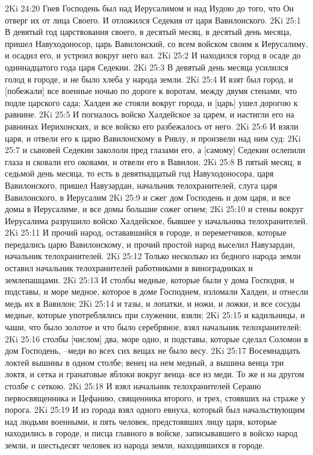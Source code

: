 2Ki 24:20  Гнев Господень был над Иерусалимом и над Иудою до того, что Он отверг их от лица Своего. И отложился Седекия от царя Вавилонского.
2Ki 25:1  В девятый год царствования своего, в десятый месяц, в десятый день месяца, пришел Навуходоносор, царь Вавилонский, со всем войском своим к Иерусалиму, и осадил его, и устроил вокруг него вал.
2Ki 25:2  И находился город в осаде до одиннадцатого года царя Седекии.
2Ki 25:3  В девятый день месяца усилился голод в городе, и не было хлеба у народа земли.
2Ki 25:4  И взят был город, и [побежали] все военные ночью по дороге к воротам, между двумя стенами, что подле царского сада; Халдеи же стояли вокруг города, и [царь] ушел дорогою к равнине.
2Ki 25:5  И погналось войско Халдейское за царем, и настигли его на равнинах Иерихонских, и все войско его разбежалось от него.
2Ki 25:6  И взяли царя, и отвели его к царю Вавилонскому в Ривлу, и произвели над ним суд:
2Ki 25:7  и сыновей Седекии закололи пред глазами его, а [самому] Седекии ослепили глаза и сковали его оковами, и отвели его в Вавилон.
2Ki 25:8  В пятый месяц, в седьмой день месяца, то есть в девятнадцатый год Навуходоносора, царя Вавилонского, пришел Навузардан, начальник телохранителей, слуга царя Вавилонского, в Иерусалим
2Ki 25:9  и сжег дом Господень и дом царя, и все домы в Иерусалиме, и все домы большие сожег огнем;
2Ki 25:10  и стены вокруг Иерусалима разрушило войско Халдейское, бывшее у начальника телохранителей.
2Ki 25:11  И прочий народ, остававшийся в городе, и переметчиков, которые передались царю Вавилонскому, и прочий простой народ выселил Навузардан, начальник телохранителей.
2Ki 25:12  Только несколько из бедного народа земли оставил начальник телохранителей работниками в виноградниках и землепашцами.
2Ki 25:13  И столбы медные, которые были у дома Господня, и подставы, и море медное, которое в доме Господнем, изломали Халдеи, и отнесли медь их в Вавилон;
2Ki 25:14  и тазы, и лопатки, и ножи, и ложки, и все сосуды медные, которые употреблялись при служении, взяли;
2Ki 25:15  и кадильницы, и чаши, что было золотое и что было серебряное, взял начальник телохранителей:
2Ki 25:16  столбы [числом] два, море одно, и подставы, которые сделал Соломон в дом Господень, --меди во всех сих вещах не было весу.
2Ki 25:17  Восемнадцать локтей вышины в одном столбе; венец на нем медный, а вышина венца три локтя, и сетка и гранатовые яблоки вокруг венца--все из меди. То же и на другом столбе с сеткою.
2Ki 25:18  И взял начальник телохранителей Сераию первосвященника и Цефанию, священника второго, и трех, стоявших на страже у порога.
2Ki 25:19  И из города взял одного евнуха, который был начальствующим над людьми военными, и пять человек, предстоявших лицу царя, которые находились в городе, и писца главного в войске, записывавшего в войско народ земли, и шестьдесят человек из народа земли, находившихся в городе.
